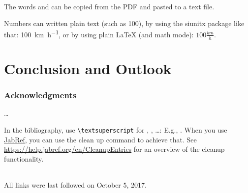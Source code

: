 \documentclass[english,runningheads,a4paper]{llncs}[2018/03/10]
\begin{document}
The words  and  can be copied from the PDF and pasted to a text file.

Numbers can written plain text (such as 100), by using the siunitx package like that:
\SI{100}{\km\per\hour},
or by using plain \LaTeX{} (and math mode):
$100 \frac{\mathit{km}}{h}$.

\section{Conclusion and Outlook}
\label{sec:outlook}
\lipsum[1-2]

\subsubsection*{Acknowledgments}
\ldots

In the bibliography, use \texttt{\textbackslash textsuperscript} for , , \ldots:
E.g., .
When you use \href{https://www.jabref.org}{JabRef}, you can use the clean up command to achieve that.
See \url{https://help.jabref.org/en/CleanupEntries} for an overview of the cleanup functionality.

\renewcommand{\bibsection}{\section*{References}} %

\begingroup
  \ifluatex
  \else
  \fi
  \small %
  
\endgroup

\ \\
%
All links were last followed on October 5, 2017.
\end{document}
